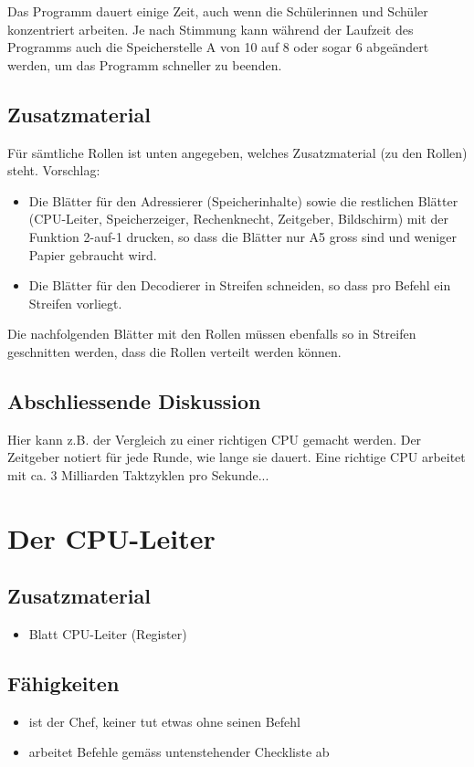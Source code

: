 \documentclass[a4paper]{kinet-intern}
\begin{document}
Das Programm dauert einige Zeit, auch wenn die Schülerinnen und Schüler konzentriert arbeiten. Je nach Stimmung kann während der Laufzeit des Programms auch die Speicherstelle A von 10 auf 8 oder sogar 6 abgeändert werden, um das Programm schneller zu beenden.

\subsection*{Zusatzmaterial}
Für sämtliche Rollen ist unten angegeben, welches Zusatzmaterial (zu den Rollen) steht.
Vorschlag:
\begin{itemize}
	\item Die Blätter für den Adressierer (Speicherinhalte) sowie die restlichen Blätter (CPU-Leiter, Speicherzeiger, Rechenknecht, Zeitgeber, Bildschirm) mit der Funktion 2-auf-1 drucken, so dass die Blätter nur A5 gross sind und weniger Papier gebraucht wird.
	\item Die Blätter für den Decodierer in Streifen schneiden, so dass pro Befehl ein Streifen vorliegt.
\end{itemize}

Die nachfolgenden Blätter mit den Rollen müssen ebenfalls so in Streifen geschnitten werden, dass die Rollen verteilt werden können.

\subsection*{Abschliessende Diskussion}
Hier kann z.B. der Vergleich zu einer richtigen CPU gemacht werden. Der Zeitgeber notiert für jede Runde, wie lange sie dauert. Eine richtige CPU arbeitet mit ca. 3 Milliarden Taktzyklen pro Sekunde...

\pagebreak

\section*{Der CPU-Leiter}

\subsection*{Zusatzmaterial}
\begin{itemize}
	\item Blatt \dq{}CPU-Leiter\dq{} (Register)
\end{itemize}

\subsection*{Fähigkeiten}
\begin{itemize}
	\item ist der Chef, keiner tut etwas ohne seinen Befehl
	\item arbeitet Befehle gemäss untenstehender Checkliste ab
\end{itemize}
\end{document}
